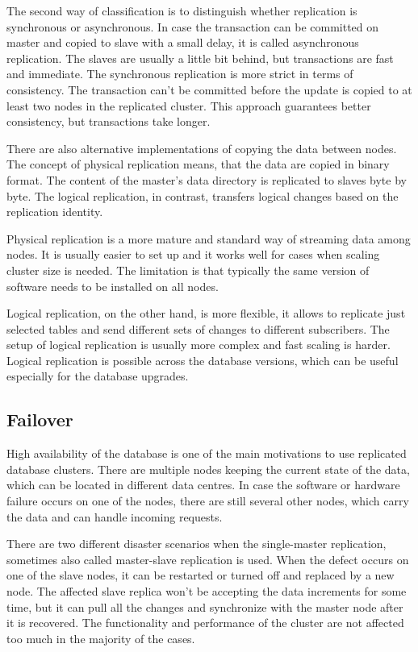 \documentclass[
  digital, %
  twoside, %
  table,   %
  nolof,   %
  nolot,   %
]{fithesis3}
\begin{document}
The second way of classification is to distinguish whether replication is synchronous or asynchronous. In case the transaction can be committed on master and copied to slave with a small delay, it is called asynchronous replication. The slaves are usually a little bit behind, but transactions are fast and immediate. The synchronous replication is more strict in terms of consistency. The transaction can't be committed before the update is copied to at least two nodes in the replicated cluster. This approach guarantees better consistency, but transactions take longer.

There are also alternative implementations of copying the data between nodes. The concept of physical replication means, that the data are copied in binary format. The content of the master's data directory is replicated to slaves byte by byte. The logical replication, in contrast, transfers logical changes based on the replication identity.

Physical replication is a more mature and standard way of streaming data among nodes. It is usually easier to set up and it works well for cases when scaling cluster size is needed. The limitation is that typically the same version of software needs to be installed on all nodes.

Logical replication, on the other hand, is more flexible, it allows to replicate just selected tables and send different sets of changes to different subscribers. The setup of logical replication is usually more complex and fast scaling is harder. Logical replication is possible across the database versions, which can be useful especially for the database upgrades.

\subsection{Failover} \label{sec:failover}
High availability of the database is one of the main motivations to use replicated database clusters. There are multiple nodes keeping the current state of the data, which can be located in different data centres. In case the software or hardware failure occurs on one of the nodes, there are still several other nodes, which carry the data and can handle incoming requests.

There are two different disaster scenarios when the single-master replication, sometimes also called master-slave replication is used. When the defect occurs on one of the slave nodes, it can be restarted or turned off and replaced by a new node. The affected slave replica won't be accepting the data increments for some time, but it can pull all the changes and synchronize with the master node after it is recovered. The functionality and performance of the cluster are not affected too much in the majority of the cases.
\end{document}
